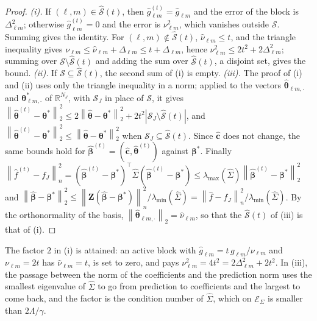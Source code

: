 \documentclass[10pt]{book}
\theoremstyle{definition}
\newcommand{\R}{\mathbb{R}}
\newcommand{\T}{^{\top}}
\newcommand{\norm}[1]{\left\lVert #1 \right\rVert}
\newcommand{\normn}[1]{\left\lVert #1 \right\rVert_{n}}
\newcommand{\cv}{\ell}
\newcommand{\md}{m}
\newcommand{\NJ}{N_{J}}
\newcommand{\bZ}{\mathbf{Z}}
\newcommand{\gcomp}[2]{g_{#1#2}}
\newcommand{\btheta}{\boldsymbol{\theta}}
\newcommand{\thetastar}{\btheta^{*}}
\newcommand{\thetahat}{\widehat{\btheta}}
\newcommand{\bbeta}{\boldsymbol{\beta}}
\newcommand{\betastar}{\bbeta^{*}}
\newcommand{\betahat}{\widehat{\bbeta}}
\newcommand{\chat}{\widehat{\mathbf{c}}}
\newcommand{\Gramhat}{\widehat{\Sigma}}
\newcommand{\lmin}{\lambda_{\min}}
\newcommand{\lmaxx}{\lambda_{\max}}
\newcommand{\ESig}{\mathcal{E}_{\Sigma}}
\newcommand{\Dbl}{\Delta_{\cv\md}}
\begin{document}
{\begin{proof}
\emph{(i).} If $(\cv,\md) \in \widehat{\mathcal{S}}(t)$, then
$\widehat{g}^{(t)}_{\cv\md} = \widehat{g}_{\cv\md}$ and the error of the block
is $\Dbl^{2}$; otherwise $\widehat{g}^{(t)}_{\cv\md} = 0$ and the error is
$\nu_{\cv\md}^{2}$, which vanishes outside $\mathcal{S}$. Summing gives the
identity. For $(\cv,\md) \notin \widehat{\mathcal{S}}(t)$,
$\widehat{\nu}_{\cv\md} \le t$, and the triangle inequality gives
$\nu_{\cv\md} \le \widehat{\nu}_{\cv\md} + \Dbl \le t + \Dbl$, hence
$\nu_{\cv\md}^{2} \le 2t^{2} + 2\Dbl^{2}$; summing over
$\mathcal{S}\setminus\widehat{\mathcal{S}}(t)$ and adding the sum over
$\widehat{\mathcal{S}}(t)$, a disjoint set, gives the bound.
\emph{(ii).} If $\mathcal{S} \subseteq \widehat{\mathcal{S}}(t)$, the second sum
of (i) is empty.
\emph{(iii).} The proof of (i) and (ii) uses only the triangle inequality in a
norm; applied to the vectors $\thetahat_{\cv\md,\cdot}$ and
$\thetastar_{\cv\md,\cdot}$ of $\R^{\NJ}$, with $\mathcal{S}_J$ in place of
$\mathcal{S}$, it gives $\norm{\thetahat^{(t)}-\thetastar}_{2}^{2} \le
2\norm{\thetahat-\thetastar}_{2}^{2} +
2t^{2}|\mathcal{S}_J\setminus\widehat{\mathcal{S}}(t)|$, and
$\norm{\thetahat^{(t)}-\thetastar}_{2}^{2} \le \norm{\thetahat-\thetastar}_{2}^{2}$
when $\mathcal{S}_J \subseteq \widehat{\mathcal{S}}(t)$. Since $\chat$ does not
change, the same bounds hold for $\betahat^{(t)} = (\chat,\thetahat^{(t)})$
against $\betastar$. Finally
$\normn{\widehat{f}^{(t)}-f_J}^{2} = (\betahat^{(t)}-\betastar)\T\Gramhat
(\betahat^{(t)}-\betastar) \le
\lmaxx(\Gramhat)\norm{\betahat^{(t)}-\betastar}_{2}^{2}$ and
$\norm{\betahat-\betastar}_{2}^{2} \le
\normn{\bZ(\betahat-\betastar)}^{2}/\lmin(\Gramhat) =
\normn{\widehat{f}-f_J}^{2}/\lmin(\Gramhat)$. By the orthonormality of the
basis, $\norm{\thetahat_{\cv\md,\cdot}}_{2} = \widehat{\nu}_{\cv\md}$, so that the
$\widehat{\mathcal{S}}(t)$ of (iii) is that of (i).
\end{proof}

The factor $2$ in (i) is attained: an active block with
$\widehat{g}_{\cv\md} = t\,\gcomp{\cv}{\md}/\nu_{\cv\md}$ and
$\nu_{\cv\md} = 2t$ has $\widehat{\nu}_{\cv\md} = t$, is set to zero, and pays
$\nu_{\cv\md}^{2} = 4t^{2} = 2\Dbl^{2} + 2t^{2}$. In (iii), the passage between
the norm of the coefficients and the prediction norm uses the smallest
eigenvalue of $\Gramhat$ to go from prediction to coefficients and the largest
to come back, and the factor is the condition number of $\Gramhat$, which on
$\ESig$ is smaller than $2\Lambda/\gamma$.


}
\end{document}
